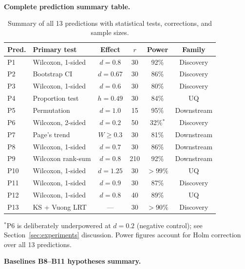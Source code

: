 \documentclass{article}
\theoremstyle{definition}
\theoremstyle{plain}
\theoremstyle{remark}
\begin{document}
\textbf{Complete prediction summary table.}

\begin{table}[htb]
\centering
\small
\caption{Summary of all 13 predictions with statistical tests,
corrections, and sample sizes.}
\label{tab:all_predictions}
\begin{tabular}{llcccc}
\toprule
\textbf{Pred.} & \textbf{Primary test} & \textbf{Effect}
  & \textbf{$r$} & \textbf{Power} & \textbf{Family} \\
\midrule
P1 & Wilcoxon, 1-sided & $d = 0.8$ & 30 & 92\% & Discovery \\
P2 & Bootstrap CI & $d = 0.67$ & 30 & 86\% & Discovery \\
P3 & Wilcoxon, 1-sided & $d = 0.6$ & 30 & 80\% & Discovery \\
P4 & Proportion test & $h = 0.49$ & 30 & 84\% & UQ \\
P5 & Permutation & $d = 1.0$ & 15 & 95\% & Downstream \\
P6 & Wilcoxon, 2-sided & $d = 0.2$ & 50 & 32\%$^*$ & Discovery \\
P7 & Page's trend & $W \geq 0.3$ & 30 & 81\% & Downstream \\
P8 & Wilcoxon, 1-sided & $d = 0.7$ & 30 & 86\% & Downstream \\
P9 & Wilcoxon rank-sum & $d = 0.8$ & 210 & 92\% & Downstream \\
P10 & Wilcoxon, 1-sided & $d = 1.25$ & 30 & $>99\%$ & UQ \\
P11 & Wilcoxon, 1-sided & $d = 0.9$ & 30 & 87\% & Discovery \\
P12 & Wilcoxon, 1-sided & $d = 0.8$ & 40 & 89\% & UQ \\
P13 & KS + Vuong LRT & --- & 30 & $>90\%$ & Discovery \\
\bottomrule
\end{tabular}

\smallskip
{\footnotesize $^*$P6 is deliberately underpowered at $d = 0.2$ (negative
control); see Section~\ref{sec:experiments} discussion.
Power figures account for Holm correction over all 13 predictions.}
\end{table}

\textbf{Baselines B8--B11 hypotheses summary.}
\end{document}

